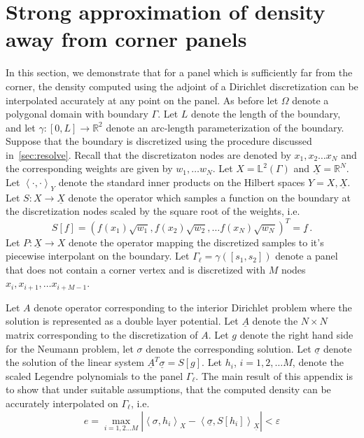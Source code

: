 \documentclass[12pt,times]{elsarticle}
\newcommand{\uA}{\underline{A}}
\newcommand{\usigma}{\underline{\sigma}}
\newcommand{\uX}{\underline{X}}
\begin{document}
\section{Strong approximation of density away from corner panels}
\label{sec:appb}
{\color{blue}
In this section, we demonstrate that for a panel which is sufficiently far from the corner, the density computed using the adjoint of a Dirichlet discretization can be interpolated 
accurately at any point on the panel. As before let $\Omega$ denote a polygonal domain with boundary $\Gamma$. Let
$L$ denote the length of the boundary, and let $\gamma: [0,L]\to \mathbb{R}^2$ denote an arc-length parameterization of the boundary. Suppose that the boundary is discretized using the procedure discussed in~\cref{sec:resolve}. Recall that the discretizaton nodes are denoted by $x_{1},x_{2}\ldots x_{N}$ and the corresponding weights are given by $w_{1}, \ldots w_{N}$.
Let $X = \mathbb{L}^2({\Gamma})$ and $\underline{X} = \mathbb{R}^{N}$.  Let $\left< \cdot, \cdot \right>_{Y}$
denote the standard inner products on the Hilbert spaces $Y=X,\underline{X}$.
Let $S:X \to \uX$ denote the operator which samples a function on the boundary at the discretization nodes scaled by the square root of the weights, i.e. 
\begin{equation}
S[f] = (f(x_{1})\sqrt{w_{1}},f(x_{2})\sqrt{w_{2}},\ldots f(x_{N}) \sqrt{w_N} )^{T} = \underline{f} \, .
\end{equation}
Let $P:\underline{X} \to X$ denote the operator mapping the discretized samples to it's piecewise interpolant on the boundary.
Let $\Gamma_{\ell} = \gamma([s_{1},s_{2}])$ denote a panel that does not contain a corner vertex and is discretized with $M$ nodes  $x_{i},x_{i+1},\ldots x_{i+M-1}$.


Let $A$ denote operator corresponding to the interior Dirichlet problem where the solution is represented as a double layer potential. Let $\underline{A}$ denote the $N\times N$ matrix corresponding to the discretization of $A$. Let $g$ denote the
right hand side for the Neumann problem, let $\sigma$ denote the corresponding solution.   Let $\underline{\sigma}$ denote the solution of the linear system $\uA^{T} \usigma = S[g]$. Let $h_{i}$, $i=1,2,\ldots M$, denote the scaled Legendre polynomials to the panel $\Gamma_{\ell}$.
The main result of this appendix is to show that under suitable assumptions, that the computed density can be accurately interpolated on $\Gamma_{\ell}$, i.e.  
\begin{equation}
e = \max_{i=1,2\ldots M} |\left< \sigma, h_{i} \right>_{X} -  \left< \usigma, S[h_{i}] \right>_{\uX}| < \varepsilon  
\end{equation}

}
\end{document}
